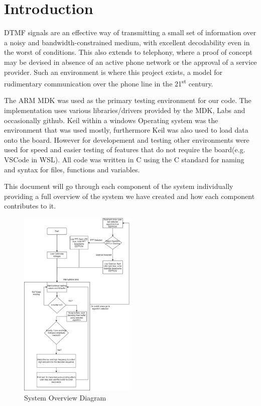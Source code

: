 \documentclass{cce2014-design}
\begin{document}
\section{Introduction}
 {
  DTMF signals	\cite{wikiDTMF} are an effective way of transmitting a small
  set of
  information over a noisy and bandwidth-constrained medium,
  with excellent decodability even in the worst of conditions. This also
  extends to telephony, where a proof of concept may be
  devised in absence of an active phone network or the approval of a
  service provider. Such an environment is where this project
  exists, a model for rudimentary communication over the phone line in
  the 21\textsuperscript{st} century.

  The ARM MDK was used as the primary testing environment for our code.
  The implementation uses
  various libraries/drivers provided by the MDK, Labs and occasionally github.
  Keil within a
  windows Operating system was the environment that was used mostly,
  furthermore Keil was also used to load data onto the board. However for
  developement and testing other environments were used for
  speed and easier testing of features that do not require the board(e.g.
  VSCode in WSL).
  All code was written in C using the C standard for naming and syntax
  for files, functions and variables.

  This document will go through each component of the system individually
  providing a full overview of the system we have created and how each
  component contributes to it.

  \begin{figure}[H]
	  \centering
	  \includegraphics[width=0.5\textwidth]{sys_diagram}
	  \caption{System Overview Diagram}
	  \label{fig:systemDiagram}
  \end{figure}
 }
\end{document}
